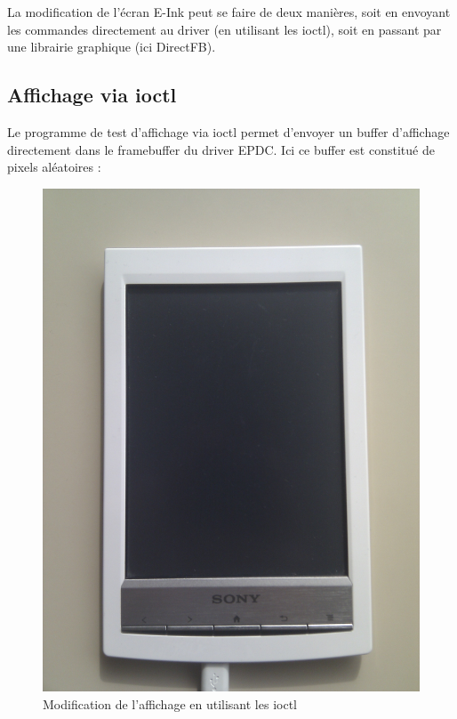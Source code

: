 La modification de l'écran E-Ink peut se faire de deux manières, soit en envoyant les commandes directement au driver (en utilisant les ioctl), soit en passant par une librairie graphique (ici DirectFB).

\subsection{Affichage via ioctl}

Le programme de test d'affichage via ioctl permet d'envoyer un buffer d'affichage directement dans le framebuffer du driver EPDC.
Ici ce buffer est constitué de pixels aléatoires : 
	
	\begin{figure}[h!]
		\begin{center}
			\includegraphics[scale=0.15]{screen_get_temp.jpg}
			 \caption{Modification de l'affichage en utilisant les ioctl}
		\end{center}
	\end{figure}
